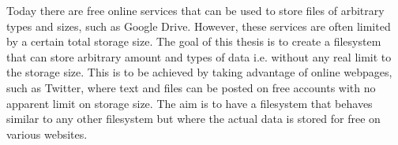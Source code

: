 



Today there are free online services that can be used to store files of arbitrary types and sizes, such as Google Drive. However, these services are often limited by a certain total storage size. The goal of this thesis is to create a filesystem that can store arbitrary amount and types of data i.e. without any real limit to the storage size. This is to be achieved by taking advantage of online webpages, such as Twitter, where text and files can be posted on free accounts with no apparent limit on storage size. The aim is to have a filesystem that behaves similar to any other filesystem but where the actual data is stored for free on various websites.